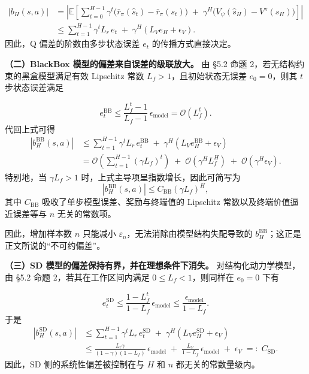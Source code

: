 \documentclass[UTF8]{ctexart}
\begin{document}
\[
\begin{aligned}
|b_H(s,a)|
&=
\left|
\mathbb E\!\left[
\sum_{t=0}^{H-1}\gamma^t \bigl(\bar r_\pi(\hat s_t)-\bar r_\pi(s_t)\bigr)
\;+\;
\gamma^H\bigl(V_\psi(\hat s_H)-V^\pi(s_H)\bigr)
\right]
\right| \\
&\le
\sum_{t=1}^{H-1}\gamma^t L_r\, e_t
\;+\;
\gamma^H\!\left(L_V e_H + \epsilon_V\right).
\end{aligned}
\]
因此，Q 偏差的阶数由多步状态误差 \(e_t\) 的传播方式直接决定。

\textbf{（二）BlackBox 模型的偏差来自误差的级联放大。} 由 §5.2 命题 2，若无结构约束的黑盒模型满足有效 Lipschitz 常数 \(L_f>1\)，且初始状态无误差 \(e_0=0\)，则其 \(t\) 步状态误差满足

\[
e_t^{\mathrm{BB}}
\le
\frac{L_f^t-1}{L_f-1}\,\epsilon_{\text{model}}
=
\mathcal O(L_f^t).
\]
代回上式可得
\[
\begin{aligned}
|b_H^{\mathrm{BB}}(s,a)|
&\le
\sum_{t=1}^{H-1}\gamma^t L_r\, e_t^{\mathrm{BB}}
\;+\;
\gamma^H\!\left(L_V e_H^{\mathrm{BB}}+\epsilon_V\right) \\
&=
\mathcal O\!\left(\sum_{t=1}^{H-1}(\gamma L_f)^t\right)
\;+\;
\mathcal O\!\left(\gamma^H L_f^H\right)
\;+\;
\mathcal O(\gamma^H\epsilon_V).
\end{aligned}
\]
特别地，当 \(\gamma L_f>1\) 时，上式主导项呈指数增长，因此可简写为
\[
\left|b_H^{\mathrm{BB}}(s,a)\right|
\le
C_{\mathrm{BB}}(\gamma L_f)^H,
\]
其中 \(C_{\mathrm{BB}}\) 吸收了单步模型误差、奖励与终端值的 Lipschitz 常数以及终端价值逼近误差等与 \(n\) 无关的常数项。

因此，增加样本数 \(n\) 只能减小 \(\varepsilon_n\)，无法消除由模型结构失配导致的 \(b_H^{\mathrm{BB}}\)；这正是正文所说的“不可约偏差”。

\textbf{（三）SD 模型的偏差保持有界，并在理想条件下消失。} 对结构化动力学模型，由 §5.2 命题 2，若其在工作区间内满足 \(0\le L_f<1\)，则同样在 \(e_0=0\) 下有

\[
e_t^{\mathrm{SD}}
\le
\frac{1-L_f^t}{1-L_f}\,\epsilon_{\text{model}}
\le
\frac{\epsilon_{\text{model}}}{1-L_f}.
\]
于是
\[
\begin{aligned}
|b_H^{\mathrm{SD}}(s,a)|
&\le
\sum_{t=1}^{H-1}\gamma^t L_r\, e_t^{\mathrm{SD}}
\;+\;
\gamma^H\!\left(L_V e_H^{\mathrm{SD}}+\epsilon_V\right) \\
&\le
\frac{L_r\gamma}{(1-\gamma)(1-L_f)}\,\epsilon_{\text{model}}
\;+\;
\frac{L_V}{1-L_f}\,\epsilon_{\text{model}}
\;+\;
\epsilon_V
\;=:\;
C_{\mathrm{SD}}.
\end{aligned}
\]
因此，SD 侧的系统性偏差被控制在与 \(H\) 和 \(n\) 都无关的常数量级内。
\end{document}
